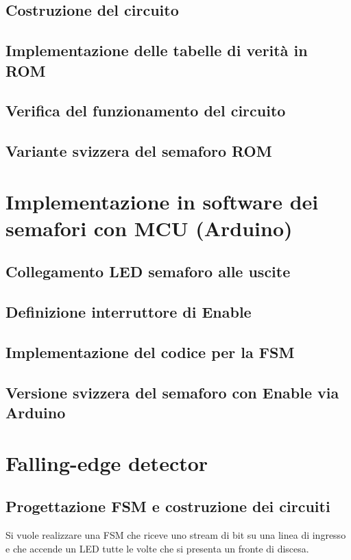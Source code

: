 \documentclass[10pt, a4paper, italian]{article}
\begin{document}
\subsection{Costruzione del circuito}

\subsection{Implementazione delle tabelle di verità in ROM}

\subsection{Verifica del funzionamento del circuito}

\subsection{Variante svizzera del semaforo ROM}

\section{Implementazione in software dei semafori con MCU (Arduino)}
\subsection{Collegamento LED semaforo alle uscite}

\subsection{Definizione interruttore di Enable}

\subsection{Implementazione del codice per la FSM}

\subsection{Versione svizzera del semaforo con Enable via Arduino}

\section{Falling-edge detector}
\subsection{Progettazione FSM e costruzione dei circuiti}
Si vuole realizzare una FSM che riceve uno stream di bit su una linea di
ingresso e che accende un LED tutte le volte che si presenta un fronte di
discesa.
\end{document}
